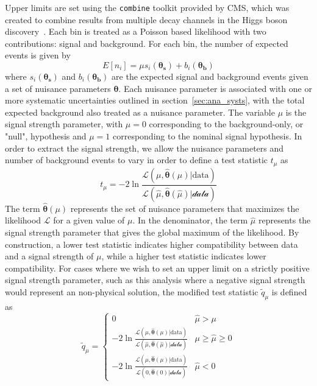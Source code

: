 Upper limits are set using the \texttt{combine} toolkit provided by CMS, which was created to combine results from multiple decay channels in the Higgs boson discovery~\cite{CMS:2024onh}. Each bin is treated as a Poisson based likelihood with two contributions: signal and background. For each bin, the number of expected events is given by
\begin{equation}
	\label{eq:expected_events}
	E[n_i]=\mu s_i(\boldsymbol{\theta_s})+b_i(\boldsymbol{\theta_b})
\end{equation}
where $s_i(\boldsymbol{\theta_s})$ and $b_i(\boldsymbol{\theta_b})$ are the expected signal and background events given a set of nuisance parameters $\boldsymbol{\theta}$. Each nuisance parameter is associated with one or more systematic uncertainties outlined in section~\ref{sec:ana_systs}, with the total expected background also treated as a nuisance parameter. The variable $\mu$ is the signal strength parameter, with $\mu=0$ corresponding to the background-only, or "null", hypothesis and $\mu=1$ corresponding to the nominal signal hypothesis. In order to extract the signal strength, we allow the nuisance parameters and number of background events to vary in order to define a test statistic $t_\mu$ as
\begin{equation}
	\label{eq:test_stat}
	t_\mu=-2\ln{\frac{\mathcal{L}(\mu, \hat{\boldsymbol{\theta}}(\mu)|\text{data})}{\mathcal{L(\hat{\mu}, \hat{\boldsymbol{\theta}}(\hat{\mu})|\text{data})}}}
\end{equation}
The term $\hat{\boldsymbol{\theta}}(\mu)$ represents the set of nuisance parameters that maximizes the likelihood $\mathcal{L}$ for a given value of $\mu$. In the denominator, the term $\hat{\mu}$ represents the signal strength parameter that gives the global maximum of the likelihood. By construction, a lower test statistic indicates higher compatibility between data and a signal strength of $\mu$, while a higher test statistic indicates lower compatibility. For cases where we wish to set an upper limit on a strictly positive signal strength parameter, such as this analysis where a negative signal strength would represent an non-physical solution, the modified test statistic $\tilde{q}_\mu$ is defined as
\begin{equation}
	\label{eq:test_stat2}
	\tilde{q}_\mu=\begin{cases}
		0 & \hat{\mu}>\mu \\
		-2\ln{\frac{\mathcal{L}(\mu,\hat{\boldsymbol{\theta}}(\mu)|\text{data})}{\mathcal{L(\hat{\mu}, \hat{\boldsymbol{\theta}}(\hat{\mu})|\text{data})}}} & \mu\geq\hat{\mu}\geq0 \\
		-2\ln{\frac{\mathcal{L}(\mu,\hat{\boldsymbol{\theta}}(\mu)|\text{data})}{\mathcal{L(\text{0} , \hat{\boldsymbol{\theta}}( \text{0} )|\text{data})}}} & \hat{\mu}<0
	\end{cases}
\end{equation}

